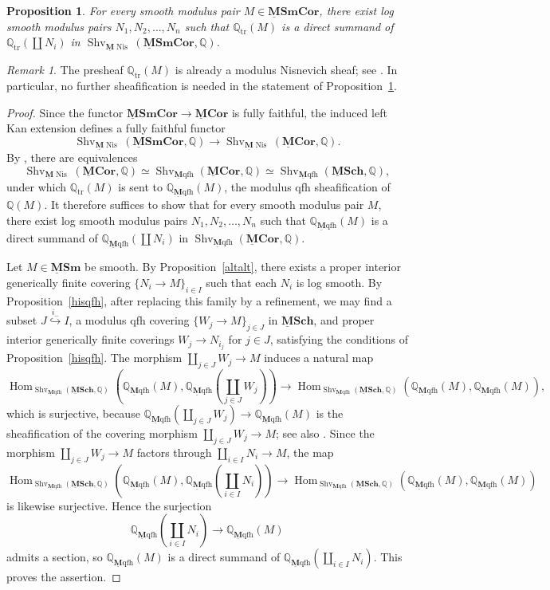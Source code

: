 \documentclass[11pt]{amsart}
\newcommand{\Q}{\mathbb{Q}}
\newcommand{\Shv}{{\operatorname{Shv}}}
\newcommand{\Mqfh}{\ulM \text{qfh}}
\newcommand{\Hom}{\operatorname{Hom}}
\newcommand{\tr}{{\operatorname{tr}}}
\newcommand{\Nis}{{\operatorname{Nis}}}
\newcommand{\M}{\mathbf{M}}
\newcommand{\ulM}{\underline{\M}}
\newcommand{\ulMCor}{\operatorname{\mathbf{\underline{M}Cor}}}
\newcommand{\ulMSm}{\operatorname{\mathbf{\underline{M}Sm}}}
\newcommand{\ulMSCH}{\operatorname{\mathbf{\underline{M}Sch}}}
\newcommand{\ulMSmCor}{\operatorname{\mathbf{\underline{M}SmCor}}}
\newtheorem{prop}[lemma]{Proposition}
\theoremstyle{definition}
\theoremstyle{remark}
\newtheorem{remark}[lemma]{Remark}
\numberwithin{equation}{section}
\begin{document}
\begin{prop}\label{kawarikawari}
For every smooth modulus pair $M\in \ulMSmCor$, there exist log smooth modulus pairs $N_1,N_2,\dots,N_n$ such that $\Q_\tr(M)$ is a direct summand of $\Q_\tr(\coprod N_i)$ in $\Shv_{\ulM\Nis}(\ulMSmCor,\Q)$.
\end{prop}

\begin{remark}
The presheaf $\Q_\tr(M)$ is already a modulus Nisnevich sheaf; see \cite[Corollary 5.34]{KM21}. In particular, no further sheafification is needed in the statement of Proposition~\ref{kawarikawari}.
\end{remark}

\begin{proof}
Since the functor $\ulMSmCor \to\ulMCor$ is fully faithful, the induced left Kan extension defines a fully faithful functor
\[
\Shv_{\ulM \Nis}(\ulMSmCor, \Q) \to \Shv_{\ulM \Nis}(\ulMCor, \Q).
\]
By \cite[Theorems 6.9 and 6.10]{KM21}, there are equivalences
\[
\Shv_{\ulM\Nis}(\ulMCor,\Q)\simeq \Shv_{\Mqfh}(\ulMCor,\Q) \simeq \Shv_{\Mqfh}(\ulMSCH,\Q),
\]
under which $\Q_\tr(M)$ is sent to $\Q_{\Mqfh}(M)$, the modulus qfh sheafification of $\Q(M)$. It therefore suffices to show that for every smooth modulus pair $M$, there exist log smooth modulus pairs $N_1,N_2,\dots,N_n$ such that $\Q_{\Mqfh}(M)$ is a direct summand of $\Q_{\Mqfh}(\coprod N_i)$ in $\Shv_{\Mqfh}(\ulMCor,\Q)$.

Let $M\in \ulMSm$ be smooth. By Proposition~\ref{altalt}, there exists a proper interior generically finite covering $\{N_i \to M\}_{i\in I}$ such that each $N_i$ is log smooth. By Proposition~\ref{hisqfh}, after replacing this family by a refinement, we may find a subset $J \overset{i_{-}}{\hookrightarrow} I$, a modulus qfh covering $\{W_j \to M\}_{j \in J}$ in $\ulMSCH$, and proper interior generically finite coverings $W_j \to N_{i_j}$ for $j\in J$, satisfying the conditions of Proposition~\ref{hisqfh}. The morphism $\coprod_{j\in J} W_j \to M$ induces a natural map
\[
\Hom_{\Shv_{\Mqfh}(\ulMSCH,\Q)}(\Q_{\Mqfh}(M),\Q_{\Mqfh}(\coprod_{j\in J} W_j)) \to \Hom_{\Shv_{\Mqfh}(\ulMSCH,\Q)}(\Q_{\Mqfh}(M),\Q_{\Mqfh}(M)),
\]
which is surjective, because $\Q_{\Mqfh}(\coprod_{j\in J} W_j) \to \Q_{\Mqfh}(M)$ is the sheafification of the covering morphism $\coprod_{j\in J} W_j \to M$; see also \cite[Proof of Theorem 6.10]{KM21}. Since the morphism $\coprod_{j\in J} W_j \to M$ factors through $\coprod_{i\in I} N_i \to M$, the map
\[
\Hom_{\Shv_{\Mqfh}(\ulMSCH,\Q)}(\Q_{\Mqfh}(M),\Q_{\Mqfh}(\coprod_{i\in I} N_i)) \to \Hom_{\Shv_{\Mqfh}(\ulMSCH,\Q)}(\Q_{\Mqfh}(M),\Q_{\Mqfh}(M))
\]
is likewise surjective. Hence the surjection
\[
\Q_{\Mqfh}(\coprod_{i\in I} N_i) \to \Q_{\Mqfh}(M)
\]
admits a section, so $\Q_{\Mqfh}(M)$ is a direct summand of $\Q_{\Mqfh}(\coprod_{i\in I} N_i)$. This proves the assertion.
\end{proof}
\end{document}
